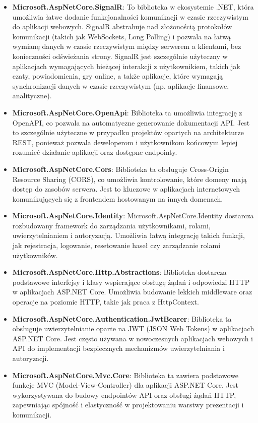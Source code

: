 \documentclass[12pt,a4paper]{article}
\begin{document}
\begin{itemize}
    \item \textbf{Microsoft.AspNetCore.SignalR}: To biblioteka w ekosystemie .NET, która umożliwia łatwe dodanie funkcjonalności komunikacji w czasie rzeczywistym do aplikacji webowych. SignalR abstrahuje nad złożonością protokołów komunikacji (takich jak WebSockets, Long Polling) i pozwala na łatwą wymianę danych w czasie rzeczywistym między serwerem a klientami, bez konieczności odświeżania strony. SignalR jest szczególnie użyteczny w aplikacjach wymagających bieżącej interakcji z użytkownikiem, takich jak czaty, powiadomienia, gry online, a także aplikacje, które wymagają synchronizacji danych w czasie rzeczywistym (np. aplikacje finansowe, analityczne).
    \item \textbf{Microsoft.AspNetCore.OpenApi}: Biblioteka ta umożliwia integrację z OpenAPI, co pozwala na automatyczne generowanie dokumentacji API. Jest to szczególnie użyteczne w przypadku projektów opartych na architekturze REST, ponieważ pozwala deweloperom i użytkownikom końcowym lepiej rozumieć działanie aplikacji oraz dostępne endpointy.
    \item \textbf{Microsoft.AspNetCore.Cors}: Biblioteka ta obsługuje Cross-Origin Resource Sharing (CORS), co umożliwia kontrolowanie, które domeny mają dostęp do zasobów serwera. Jest to kluczowe w aplikacjach internetowych komunikujących się z frontendem hostowanym na innych domenach.
    \item \textbf{Microsoft.AspNetCore.Identity}: Microsoft.AspNetCore.Identity dostarcza rozbudowany framework do zarządzania użytkownikami, rolami, uwierzytelnianiem i autoryzacją. Umożliwia łatwą integrację takich funkcji, jak rejestracja, logowanie, resetowanie haseł czy zarządzanie rolami użytkowników.
    \item \textbf{Microsoft.AspNetCore.Http.Abstractions}: Biblioteka dostarcza podstawowe interfejsy i klasy wspierające obsługę żądań i odpowiedzi HTTP w aplikacjach ASP.NET Core. Umożliwia budowanie lekkich middleware oraz operacje na poziomie HTTP, takie jak praca z HttpContext.
    \item \textbf{Microsoft.AspNetCore.Authentication.JwtBearer}: Biblioteka ta obsługuje uwierzytelnianie oparte na JWT (JSON Web Tokens) w aplikacjach ASP.NET Core. Jest często używana w nowoczesnych aplikacjach webowych i API do implementacji bezpiecznych mechanizmów uwierzytelniania i autoryzacji.
    \item \textbf{Microsoft.AspNetCore.Mvc.Core}: Biblioteka ta zawiera podstawowe funkcje MVC (Model-View-Controller) dla aplikacji ASP.NET Core. Jest wykorzystywana do budowy endpointów API oraz obsługi żądań HTTP, zapewniając spójność i elastyczność w projektowaniu warstwy prezentacji i komunikacji.

\end{itemize}
\end{document}
